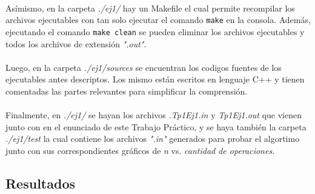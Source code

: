 \paragraph{}
Asímismo, en la carpeta \textit{./ej1/} hay un Makefile el cual permite recompilar los archivos ejecutables con tan solo ejecutar el comando \texttt{make} en la consola. Además, ejecutando el comando \texttt{make clean} se pueden eliminar los archivos ejecutables y todos los archivos de extensión \textit{".out"}.

\paragraph{}
Luego, en la carpeta \textit{./ej1/sources} se encuentran los codigos fuentes de los ejecutables antes descriptos. Los mismo están escritos en lenguaje C++ y tienen comentadas las partes relevantes para simplificar la comprensión.

\paragraph{}
Finalmente, en \textit{./ej1/} se hayan los archivos \textit{.Tp1Ej1.in} y \textit{Tp1Ej1.out} que vienen junto con en el enunciado de este Trabajo Práctico, y se haya también la carpeta \textit{./ej1/test} la cual contiene los archivos \textit{".in"} generados para probar el algortimo junto con sus correspondientes gráficos de \textit{n} vs. \textit{cantidad de operaciones}.

\subsection{Resultados}

